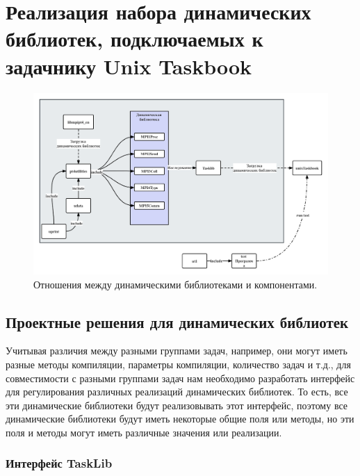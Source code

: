 \section{Реализация набора динамических библиотек, подключаемых к задачнику Unix Taskbook}

\begin{figure}[htbp]%
    \centering
    \includegraphics[width=1\linewidth]{images/relation.png}%
    \caption{Отношения между динамическими библиотеками и компонентами.}%
    \label{relation}%
\end{figure}

\subsection{Проектные решения для динамических библиотек}
Учитывая различия между разными группами задач, например, они могут иметь разные методы компиляции, параметры 
компиляции, количество задач и т.д., для совместимости с разными группами задач нам необходимо разработать 
интерфейс для регулирования различных реализаций динамических библиотек. То есть, все эти динамические библиотеки 
будут реализовывать этот интерфейс, поэтому все динамические библиотеки будут иметь некоторые общие поля или 
методы, но эти поля и методы могут иметь различные значения или реализации.

\subsubsection{Интерфейс TaskLib}

